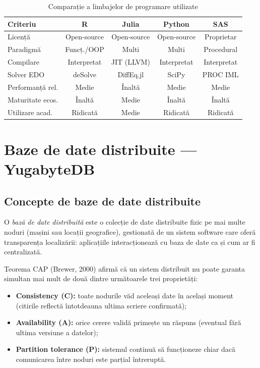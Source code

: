 \begin{table}[htbp]
\centering
\caption{Comparație a limbajelor de programare utilizate}
\label{tab:comparatie_limbaje}
\renewcommand{\arraystretch}{1.3}
\begin{tabular}{lcccc}
\toprule
\textbf{Criteriu} & \textbf{R} & \textbf{Julia} & \textbf{Python} & \textbf{SAS} \\
\midrule
Licență          & Open-source & Open-source & Open-source & Proprietar \\
Paradigmă        & Funcț./OOP  & Multi       & Multi       & Procedural \\
Compilare        & Interpretat & JIT (LLVM)  & Interpretat & Interpretat \\
Solver EDO       & deSolve     & DiffEq.jl   & SciPy       & PROC IML  \\
Performanță rel. & Medie       & Înaltă      & Medie       & Medie     \\
Maturitate ecos. & Înaltă      & Medie       & Înaltă      & Înaltă    \\
Utilizare acad.  & Ridicată    & Medie       & Ridicată    & Ridicată  \\
\bottomrule
\end{tabular}
\end{table}

\section{Baze de date distribuite — YugabyteDB}
\label{sec:yugabytedb}

\subsection{Concepte de baze de date distribuite}
\label{subsec:baze_distribuite}

O \emph{bază de date distribuită} este o colecție de date distribuite fizic
pe mai multe noduri (mașini sau locații geografice), gestionată de un sistem
software care oferă transparența localizării: aplicațiile interacționează cu
baza de date ca și cum ar fi centralizată.

\begin{definitie}
\label{def:cap}
Teorema CAP (Brewer, 2000) afirmă că un sistem distribuit nu poate garanta
simultan mai mult de două dintre următoarele trei proprietăți:
\begin{itemize}
    \item \textbf{Consistency (C):} toate nodurile văd aceleași date în același
    moment (citirile reflectă întotdeauna ultima scriere confirmată);
    \item \textbf{Availability (A):} orice cerere validă primește un răspuns
    (eventual fără ultima versiune a datelor);
    \item \textbf{Partition tolerance (P):} sistemul continuă să funcționeze
    chiar dacă comunicarea între noduri este parțial întreruptă.
\end{itemize}
\end{definitie}

